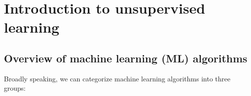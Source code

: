 \documentclass{scrartcl}
\begin{document}
    
    \maketitle
	\tableofcontents
    
    

    
    \hypertarget{introduction-to-unsupervised-learning}{%
\section{Introduction to unsupervised
learning}\label{introduction-to-unsupervised-learning}}

    \hypertarget{overview-of-machine-learning-ml-algorithms}{%
\subsection{Overview of machine learning (ML)
algorithms}\label{overview-of-machine-learning-ml-algorithms}}

Broadly speaking, we can categorize machine learning algorithms into
three groups:
\end{document}
